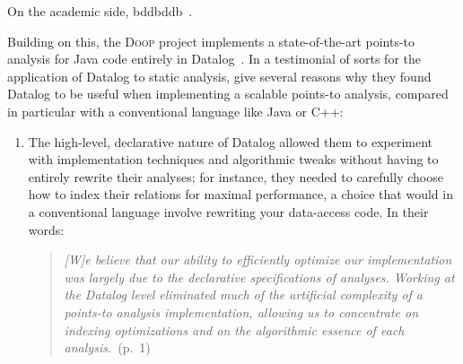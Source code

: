 On the academic side, 
bddbddb~\citep{whaley-lam,DBLP:conf/aplas/WhaleyACL05}.

Building on this, the \textsc{Doop} project implements a state-of-the-art
points-to analysis for Java code entirely in Datalog~.
%
In a testimonial of sorts for the application of Datalog to static analysis,
\citet{DBLP:conf/datalog/SmaragdakisB10} give several reasons why they found
Datalog to be useful when implementing a scalable points-to analysis, compared
in particular with a conventional language like Java or C++:

\begin{enumerate}

\item The high-level, declarative nature of Datalog allowed them to experiment
  with implementation techniques and algorithmic tweaks without having to
  entirely rewrite their analyses; for instance, they needed to carefully choose
  how to index their relations for maximal performance, a choice that would in a
  conventional language involve rewriting your data-access code.
%
  In their words:
  \nopagebreak[1]
  \begin{quote}
    \emph{[W]e believe that our ability to efficiently optimize our
      implementation was largely due to the declarative specifications of
      analyses. Working at the Datalog level eliminated much of the artificial
      complexity of a points-to analysis implementation, allowing us to
      concentrate on indexing optimizations and on the algorithmic essence of
      each analysis.}~(p.~1)
  \end{quote}
  


\end{enumerate}
